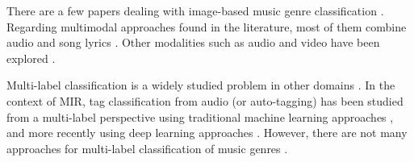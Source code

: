 There are a few papers dealing with image-based music genre classification \citep{libeks2011you}.
Regarding multimodal approaches found in the literature, most of them combine audio and song lyrics \citep{laurier2008multimodal,neumayer2007integration}. Other modalities such as audio and video have been explored \citep{schindler2015audio}. 


Multi-label classification is a widely studied problem in other domains \citep{tsoumakas2006multi,jain2016extreme}. In the context of MIR, tag classification from audio (or auto-tagging) has been studied from a multi-label perspective using traditional machine learning approaches \citep{sordo2012semantic,wang2009tag,turnbull2008semantic,bertin2008autotagger,seyerlehner2010automatic}, and more recently using deep learning approaches \citep{Choi2016,dieleman2014end}. However, there are not many approaches for multi-label classification of music genres \citep{Sanden2011,wang2009tag}.


